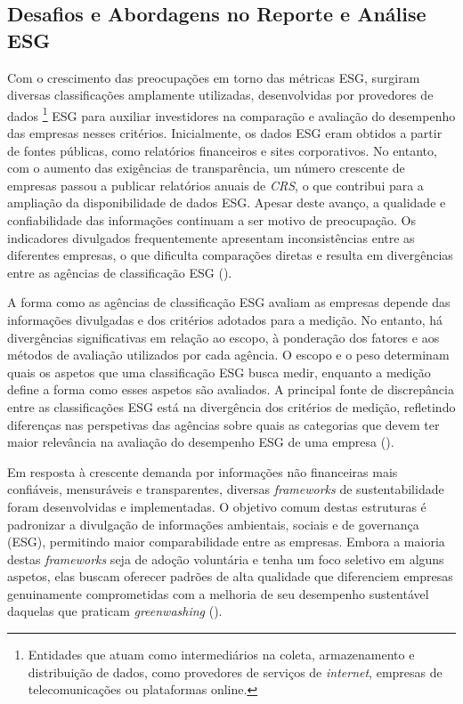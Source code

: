 
\subsection{Desafios e Abordagens no Reporte e Análise \gls{ESG}}
\label{subsec: MARAESG}

Com o crescimento das preocupações em torno das métricas \gls{ESG}, surgiram diversas classificações amplamente utilizadas, desenvolvidas por provedores de dados \footnote{Entidades que atuam como intermediários na coleta, armazenamento e distribuição de dados, como provedores de serviços de \textit{internet}, empresas de telecomunicações ou plataformas online.} \gls{ESG} para auxiliar investidores na comparação e avaliação do desempenho das empresas nesses critérios. Inicialmente, os dados \gls{ESG} eram obtidos a partir de fontes públicas, como relatórios financeiros e sites corporativos. No entanto, com o aumento das exigências de transparência, um número crescente de empresas passou a publicar relatórios anuais de \textit{\gls{CRS}}, o que contribui para a ampliação da disponibilidade de dados \gls{ESG}. Apesar deste avanço, a qualidade e confiabilidade das informações continuam a ser motivo de preocupação. Os indicadores divulgados frequentemente apresentam inconsistências entre as diferentes empresas, o que dificulta comparações diretas e resulta em divergências entre as agências de classificação \gls{ESG} (\cite{Rau2024}).

A forma como as agências de classificação \gls{ESG} avaliam as empresas depende das informações divulgadas e dos critérios adotados para a medição. No entanto, há divergências significativas em relação ao escopo, à ponderação dos fatores e aos métodos de avaliação utilizados por cada agência. O escopo e o peso determinam quais os aspetos que uma classificação \gls{ESG} busca medir, enquanto a medição define a forma como esses aspetos são avaliados. A principal fonte de discrepância entre as classificações \gls{ESG} está na divergência dos critérios de medição, refletindo diferenças nas perspetivas das agências sobre quais as categorias que devem ter maior relevância na avaliação do desempenho \gls{ESG} de uma empresa (\cite{Berg2022}).

Em resposta à crescente demanda por informações não financeiras mais confiáveis, mensuráveis e transparentes, diversas \textit{frameworks} de sustentabilidade foram desenvolvidas e implementadas. O objetivo comum destas estruturas é padronizar a divulgação de informações ambientais, sociais e de governança (ESG), permitindo maior comparabilidade entre as empresas. Embora a maioria destas \textit{frameworks} seja de adoção voluntária e tenha um foco seletivo em alguns aspetos, elas buscam oferecer padrões de alta qualidade que diferenciem empresas genuinamente comprometidas com a melhoria de seu desempenho sustentável daquelas que praticam \textit{greenwashing} (\cite{Cruz2023}).

